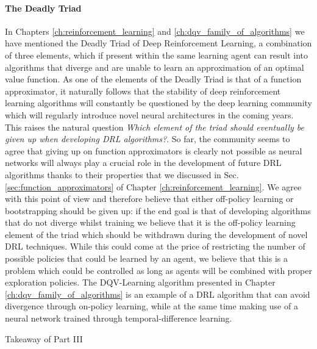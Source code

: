 \paragraph{\textbf{\uppercase{T}he \uppercase{D}eadly \uppercase{T}riad}}
In Chapters \ref{ch:reinforcement_learning} and \ref{ch:dqv_family_of_algorithms} we have mentioned the Deadly Triad of Deep Reinforcement Learning, a combination of three elements, which if present within the same learning agent can result into algorithms that diverge and are unable to learn an approximation of an optimal value function. As one of the elements of the Deadly Triad is that of a function approximator, it naturally follows that the stability of deep reinforcement learning algorithms will constantly be questioned by the deep learning community which will regularly introduce novel neural architectures in the coming years. This raises the natural question \textit{Which element of the triad should eventually be given up when developing DRL algorithms?}. So far, the community seems to agree that giving up on function approximators is clearly not possible as neural networks will always play a crucial role in the development of future DRL algorithms \cite{van2018deep_triad,hernandez2019understanding,fedus2020revisiting} thanks to their properties that we discussed in Sec. \ref{sec:function_approximators} of Chapter \ref{ch:reinforcement_learning}. We agree with this point of view and therefore believe that either off-policy learning or bootstrapping should be given up: if the end goal is that of developing algorithms that do not diverge whilst training we believe that it is the off-policy learning element of the triad which should be withdrawn during the development of novel DRL techniques. While this could come at the price of restricting the number of possible policies that could be learned by an agent, we believe that this is a problem which could be controlled as long as agents will be combined with proper exploration policies. The DQV-Learning algorithm presented in Chapter \ref{ch:dqv_family_of_algorithms} is an example of a DRL algorithm that can avoid divergence through on-policy learning, while at the same time making use of a neural network trained through temporal-difference learning. 



\begin{takeaway}{Takeaway of Part III}

\end{takeaway}







